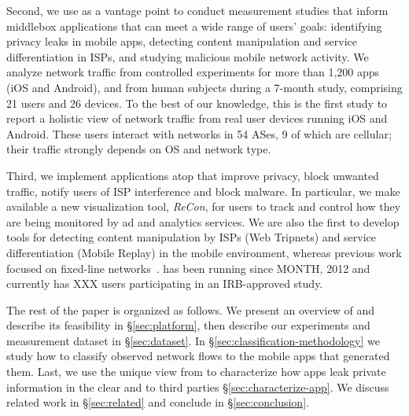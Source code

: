 Second, we use \meddle as a vantage point to conduct measurement studies that inform 
middlebox applications that can meet a wide range of users' goals: identifying privacy leaks in mobile apps, detecting content 
manipulation and service differentiation in ISPs, and studying malicious mobile network activity. We analyze network traffic from controlled experiments for more than 1,200 apps (iOS and Android), 
and from human subjects during a 7-month study, comprising 21 users and 26 devices. To the best of our knowledge, this is the first study to report a holistic 
view of network traffic from real user devices running iOS and Android. These users interact with networks in 54 ASes, 9 of which are	 cellular; their traffic 
strongly depends on OS and network type.


Third, we implement applications atop \meddle that improve 
privacy, block unwanted traffic, notify users of ISP interference and block malware. 
In particular, we make available a new visualization tool, \emph{ReCon}, for users to track and control how 
they are being monitored by ad and analytics services. 
 We are also the first to develop tools for detecting content manipulation by ISPs (Web Tripnets) and 
 service differentiation (Mobile Replay) in the mobile environment, whereas previous work focused on 
 fixed-line networks~\cite{tripnets,glasnost}. 
\meddle has been running since 
MONTH, 2012 and currently has XXX users participating in an IRB-approved study. 






The rest of the paper is organized as follows. 
We present an overview of \platname and describe its feasibility in \S\ref{sec:platform}, then describe our experiments and measurement dataset in \S\ref{sec:dataset}.
In  \S\ref{sec:classification-methodology} we study how to classify observed network flows to the mobile apps that generated them. Last, we use the 
unique view from \platname to characterize how apps leak private information in the clear and to third parties \S\ref{sec:characterize-app}. 
We discuss related work in \S\ref{sec:related} and conclude in \S\ref{sec:conclusion}.

